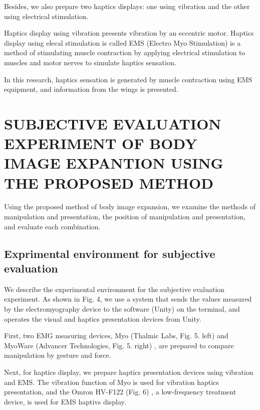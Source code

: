 \documentclass[letterpaper, 10 pt, conference]{ieeeconf}  %
\begin{document}
                        Besides, we also prepare two haptics displays: one using vibration and the other using electrical stimulation.

                        Haptics display using vibration presents vibration by an eccentric motor.  
                        Haptics display using elecal stimulation is called EMS (Electro Myo Stimulation) is a method of stimulating muscle contraction by applying electrical stimulation to muscles and motor nerves to simulate haptics sensation.  

                        In this research, haptics sensation is generated by muscle contraction using EMS equipment, and information from the wings is presented.  


\section{SUBJECTIVE EVALUATION EXPERIMENT OF BODY IMAGE EXPANTION USING THE PROPOSED METHOD}
        Using the proposed method of body image expansion, we examine the methods of manipulation and presentation, the position of manipulation and presentation, and evaluate each combination.  

        \subsection{Exprimental environment for subjective evaluation}
                We describe the experimental environment for the subjective evaluation experiment.
                As shown in Fig. 4, we use a system that sends the values measured by the electromyography device to the software (Unity) on the terminal, and operates the visual and haptics presentation devices from Unity.  

                First, two EMG measuring devices, Myo (Thalmic Labs, Fig. 5. left) and MyoWare (Advancer Technologies, Fig. 5. right) , are prepared to compare manipulation by gesture and force.  

                Next, for haptics display, we prepare haptics presentation devices using vibration and EMS.  
                The vibration function of Myo is used for vibration haptics presentation, and the Omron HV-F122 (Fig. 6) , a low-frequency treatment device, is used for EMS haptivs display.  
\end{document}
